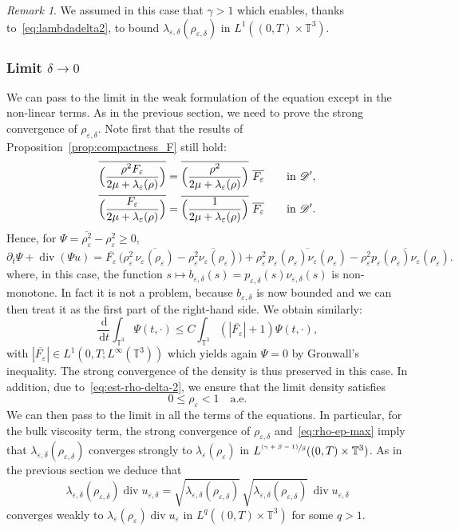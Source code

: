 \documentclass[JEP,XML,SOM,Unicode,NoEqCountersInSection]{cedram}
\let\mathcal\mathscr
\newcommand{\<}{\bigl\langle}
\renewcommand{\>}{\bigr\rangle}
\newcommand{\psfrac}[2]{\sfrac{(#1)}{#2}}
\newcommand{\labeleq}[1]{}
\theoremstyle{definition}
\theoremstyle{remark}
\newtheorem{remark}{Remark}
\newcommand{\TT}{\mathbb{T}^3}
\DeclareMathOperator{\Div}{div}
\newcommand{\di}{\,\mathrm{d}}
\let\ov\overline
\let\ep\varepsilon
\begin{document}
\begin{remark}
We assumed in this case that $\gamma > 1$ which enables, thanks to~\eqref{eq:lambdadelta2}, to bound $\lambda_{\ep,\delta}(\rho_{\ep,\delta})$ in $L^1((0,T) \times \TT)$.
\end{remark}

\subsubsection*{Limit $\delta \rightarrow 0$}
We can pass to the limit in the weak formulation of the equation except in the non-linear terms.
As in the previous section, we need to prove the strong convergence of $\rho_{\ep,\delta}$.
Note first that the results of Proposition~\ref{prop:compactness_F} still hold:
\begin{align*}\labeleq{prop:compactness_F_1-2}
\ov{\Bigl(\dfrac{\rho^2 F_\ep}{2\mu +\lambda_\ep(\rho)} \Bigr)} &= \ov{\Bigl(\dfrac{\rho^2}{2\mu +\lambda_\ep(\rho)} \Bigr)}~ \ov{F_\ep}\qquad \text{in } \mathcal{D}',\\\labeleq{prop:compactness_F_2-2}
\ov{\Bigl(\dfrac{F_\ep}{2\mu +\lambda_\ep(\rho)} \Bigr)} &= \ov{\Bigl(\dfrac{1}{2\mu +\lambda_\ep(\rho)} \Bigr)}~ \ov{F_\ep}\qquad \text{in } \mathcal{D}'.
\end{align*}
Hence, for $\Psi = \ov{\rho_\ep^2} - \rho_\ep^2 \geq 0$,
\[\labeleq{Psi-2}
\partial_t \Psi + \Div(\Psi u)
= \ov{ F_\ep } \, \bigl(\rho_\ep^2 \,\ov{\nu_\ep(\rho_\ep)} - \ov{\rho_\ep^2 \nu_\ep(\rho_\ep)} \bigr) 
 + \rho_\ep^2\, \ov{ p_\ep(\rho_\ep) \nu_\ep(\rho_\ep) } - \ov{ \rho_\ep^2 p_\ep(\rho_\ep) \nu_\ep(\rho_\ep) }.
\]
where, in this case, the function $s \mapsto b_{\ep,\delta}(s) = p_{\ep,\delta}(s) \nu_{\ep,\delta}(s)$ is non-monotone.
In fact it is not a problem, because $b_{\ep,\delta}$ is now bounded and we can then treat it as the first part of the right-hand side.
We obtain similarly:
\begin{equation*}
\dfrac{\di}{\di t} \int_{\TT}{\Psi(t,\cdot)}
\leq C \int_{\TT}{(|\ov{F_\ep}|+1)\Psi(t,\cdot)},
\end{equation*}
with $|\ov{F_\ep}|\in L^1(0,T;L^\infty(\TT))$ which yields again $\Psi = 0$ by Gronwall's inequality.
The strong convergence of the density is thus preserved in this case.
In addition, due to~\eqref{eq:est-rho-delta-2}, we ensure that the limit density satisfies
\begin{equation}\label{eq:rho-ep-max}
0\leq \rho_{\ep} < 1 \quad \text{a.e.}
\end{equation}
We can then pass to the limit in all the terms of the equations.
In particular, for the bulk viscosity term, the strong convergence of $\rho_{\ep,\delta}$ and~\eqref{eq:rho-ep-max} imply that $\lambda_{\ep,\delta}(\rho_{\ep,\delta})$ converges strongly to $\lambda_\ep(\rho_\ep)$ in $L^{\psfrac{\gamma + \beta -1}{\beta}}((0,T)\times \TT)$.
As in the previous section we deduce that
\[
\lambda_{\ep,\delta}(\rho_{\ep,\delta})\Div u_{\ep,\delta}
= \sqrt{\lambda_{\ep,\delta}(\rho_{\ep,\delta})}\,\sqrt{\lambda_{\ep,\delta}(\rho_{\ep,\delta})}\,\Div u_{\ep,\delta}
\]
converges weakly to $\lambda_\ep(\rho_\ep)\Div u_\ep$ in $L^q((0,T)\times \TT)$ for some $q>1$.
\end{document}
